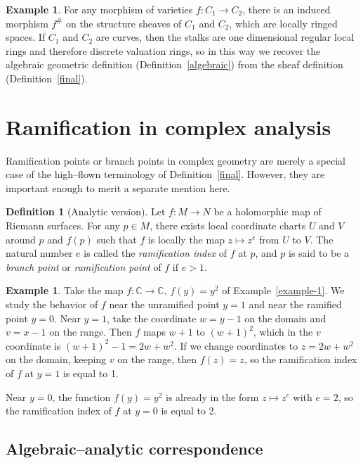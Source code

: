 \documentclass[12pt]{article}
\newcommand{\C}{\mathbb{C}}
\newcommand{\lra}{\longrightarrow}
\theoremstyle{definition}
\newtheorem{definition}[theorem]{Definition}
\newtheorem{example}[theorem]{Example}
\begin{document}
\begin{example}
For any morphism of varieties $f: C_1 \lra C_2$, there is an induced
morphism $f^\#$ on the structure sheaves of $C_1$ and $C_2$, which are
locally ringed spaces. If $C_1$ and $C_2$ are curves, then the stalks are one dimensional regular local rings and therefore discrete valuation rings, so in this way we recover the algebraic
geometric definition (Definition~\ref{algebraic}) from the sheaf
definition (Definition~\ref{final}).
\end{example}

\section{Ramification in complex analysis}

Ramification points or branch points in complex geometry are merely a
special case of the high--flown terminology of
Definition~\ref{final}. However, they are important enough to merit a
separate mention here.

\begin{definition}[Analytic version]\label{analytic}
Let $f: M \lra N$ be a holomorphic map of Riemann surfaces. For any $p
\in M$, there exists local coordinate charts $U$ and $V$ around $p$
and $f(p)$ such that $f$ is locally the map $z \mapsto z^e$ from $U$
to $V$. The natural number $e$ is called the {\em ramification index}
of $f$ at $p$, and $p$ is said to be a {\em branch point} or {\em
ramification point} of $f$ if $e > 1$.
\end{definition}

\begin{example}
Take the map $f: \C \lra \C$, $f(y) = y^2$ of
Example~\ref{example-1}. We study the behavior of $f$ near the
unramified point $y=1$ and near the ramified point $y=0$. Near $y=1$,
take the coordinate $w = y-1$ on the domain and $v = x-1$ on the
range. Then $f$ maps $w+1$ to $(w+1)^2$, which in the $v$ coordinate
is $(w+1)^2 - 1 = 2w + w^2$. If we change coordinates to $z = 2w +
w^2$ on the domain, keeping $v$ on the range, then $f(z) = z$, so the
ramification index of $f$ at $y=1$ is equal to 1.

Near $y=0$, the function $f(y) = y^2$ is already in the form $z
\mapsto z^e$ with $e=2$, so the ramification index of $f$ at $y=0$ is
equal to 2.
\end{example}

\subsection{Algebraic--analytic correspondence}
\end{document}

